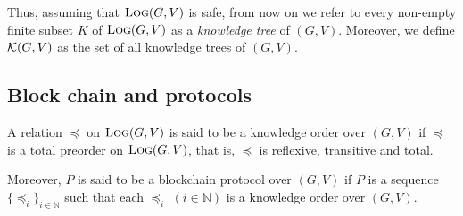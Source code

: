 Thus, assuming that $\text{\sc Log}(G,V)$ is safe, from now on we refer to every non-empty finite subset $K$ of $\text{\sc Log}(G,V)$ as a {\em knowledge tree} of $(G,V)$. Moreover, we define $\mathcal{K}(G,V)$ as the set of all knowledge trees of $(G,V)$.



\subsection{Block chain and protocols}

\begin{mydef}
A relation $\preceq$ on $\text{\sc Log}(G,V)$ is said to be a knowledge order over $(G,V)$ if $\preceq$ is a total preorder on $\text{\sc Log}(G,V)$, that is, $\preceq$ is reflexive, transitive and total.

Moreover, $P$ is said to be a blockchain protocol over $(G,V)$ if $P$ is a sequence $\{ \preceq_i\}_{i \in \mathbb{N}}$ such that each $\preceq_i$ $(i \in \mathbb{N})$ is a knowledge order over $(G,V)$.
\end{mydef}




